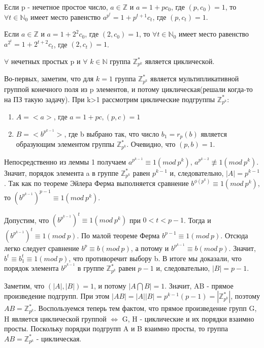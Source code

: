\begin{lemma}
	Если p - нечетное простое число, $a \in \mathbb{Z}$ и $a = 1 +pc_{0}$, где $(p,c_{0}) = 1$, то $\forall t \in \mathbb{N}_{0}$ имеет место равенство 
	$a^{p^{t}} = 1+p^{t+1}c_{t}$, где $(p,c_{t})=1$.
\end{lemma}

\begin{lemma}
	Если $a \in \mathbb{Z}$ и $a = 1 + 2^{2}c_{0}$, где $(2,c_{0}) = 1$, то $\forall t \in \mathbb{N}_{0}$ имеет место равенство 
	$a^{2^{t}} = 1+2^{t+2}c_{t}$, где $(2,c_{t})=1$.
\end{lemma}

\begin{proofs}
	$\forall$ нечетных простых p и $\forall$ $k \in \mathbb{N}$ группа $\mathbb{Z}_{p^{k}}^{*}$ является циклической.
	\begin{dokvo}
		Во-первых, заметим, что для $k=1$ группа $\mathbb{Z}_{p^{k}}^{*}$ является мультипликативной группой конечного поля из p элементов, и потому циклическая(решали когда-то на ПЗ такую задачу). При k>1 рассмотрим циклические подгруппы $\mathbb{Z}_{p^{k}}^{*}$:
		\begin{enumerate}
			\item $A=<a>$, где $a = 1 + pc, (p,c) = 1$
			\item $B=<b^{p^{k-1}}>$, где b выбрано так, что число $b_{1} = r_{p}(b)$ является образующим элементом группы $\mathbb{Z}_{p^{k}}^{*}$. Очевидно, что $(p,b)=1$.
		\end{enumerate}
		Непосредственно из леммы 1 получаем $a^{p^{k-1}} \equiv 1 (mod\ p^{k})$, $a^{p^{k-2}} \not\equiv 1 (mod\ p^{k})$. Значит, порядок элемента a в группе $\mathbb{Z}_{p^{k}}^{*}$ равен $p^{k-1}$ и, следовательно, $|A| = p^{k-1}$.
		Так как по теореме Эйлера Ферма выполняется сравнение $b^{\phi(p^{k})} \equiv 1 (mod\ p^{k})$, то $(b^{p^{k-1}})^{p-1} \equiv 1 (mod\ p^{k})$.
		
		Допустим, что $(b^{p^{k-1}})^t \equiv 1(mod\ p^{k})$ при $0 < t < p-1$. Тогда и $(b^{p^{k-1}})^t \equiv 1(mod\ p)$. По малой теореме Ферма $b^{p-1} \equiv 1 (mod\ p)$. Отсюда легко следует сравнение $b^{p} \equiv b (mod\ p)$, а потому и $b^{p^{k-1}} \equiv b (mod\ p)$. Значит, $b^t \equiv b^{t}_{1} \equiv 1 (mod\ p)$, что противоречит выбору b. В итоге мы доказали, что порядок элемента $b^{p^{k-1}}$ в группе $\mathbb{Z}_{p^{k}}^{*}$ равен $p-1$ и, следовательно, $|B| = p-1$.
		
		Заметим, что $(|A|,|B|) = 1$, и потому $|A \bigcap B|=1$. Значит, AB - прямое произведение подгрупп. При этом $|AB|=|A||B|=p^{k-1}(p-1)=|\mathbb{Z}_{p^{k}}^{*}|$, поэтому $AB = \mathbb{Z}_{p^{k}}^{*}$.
		Воспользуемся теперь тем фактом, что прямое произведение групп G, H является циклической группой $\Leftrightarrow$ G, H - циклические и их порядки взаимно просты.
		Поскольку порядки подгрупп A и B взаимно просты, то группа $AB = \mathbb{Z}_{p^{k}}^{*}$ - циклическая.
	\end{dokvo}
\end{proofs}

